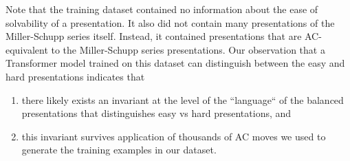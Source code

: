 Note that the training dataset contained no information about the ease of solvability of a presentation. It also did not contain many presentations of the Miller-Schupp series itself. Instead, it contained presentations that are AC-equivalent to the Miller-Schupp series presentations. Our observation that a Transformer model trained on this dataset can distinguish between the easy and hard presentations indicates that
\begin{enumerate}[label=\alph*)]
    \item there likely exists an invariant at the level of the ``language`` of the balanced presentations that distinguishes easy vs hard presentations, and
    \item this invariant survives application of thousands of AC moves we used to generate the 
training examples in our dataset. 
\end{enumerate}






